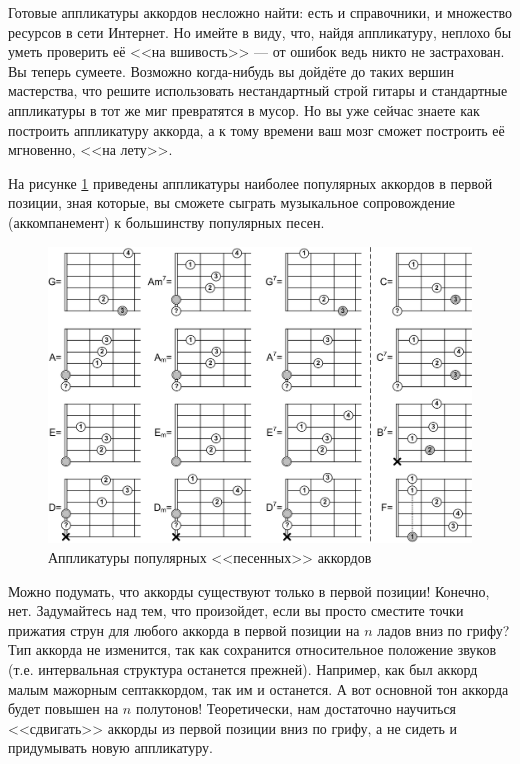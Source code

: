 Готовые аппликатуры аккордов несложно найти: есть и справочники, и множество ресурсов в сети Интернет. Но имейте в виду, что, найдя аппликатуру, неплохо бы уметь проверить её <<на вшивость>> --- от ошибок ведь никто не застрахован. Вы теперь сумеете. Возможно когда-нибудь вы дойдёте до таких вершин мастерства, что решите использовать нестандартный строй гитары и стандартные аппликатуры в тот же миг превратятся в мусор. Но вы уже сейчас знаете как построить аппликатуру аккорда, а к тому времени ваш мозг сможет построить её мгновенно, <<на лету>>.

На рисунке \ref{fig:harmony:chords:popular} приведены аппликатуры наиболее популярных аккордов в первой позиции, зная которые, вы сможете сыграть музыкальное сопровождение (аккомпанемент) к большинству популярных песен.

\begin{figure}[!ht]
    \centering
    \includegraphics[width=\textwidth]{fig/chords/popular} 
    \caption{Аппликатуры популярных <<песенных>> аккордов}\label{fig:harmony:chords:popular}
\end{figure} 

Можно подумать, что аккорды существуют только в первой позиции! Конечно, нет. Задумайтесь над тем, что произойдет, если вы просто сместите точки прижатия струн для любого аккорда в первой позиции на $n$ ладов вниз по грифу? Тип аккорда не изменится, так как сохранится относительное положение звуков (т.е. интервальная структура останется прежней). Например, как был аккорд малым мажорным септаккордом, так им и останется. А вот основной тон аккорда будет повышен на $n$ полутонов! Теоретически, нам достаточно научиться <<сдвигать>> аккорды из первой позиции вниз по грифу, а не сидеть и придумывать новую аппликатуру.

